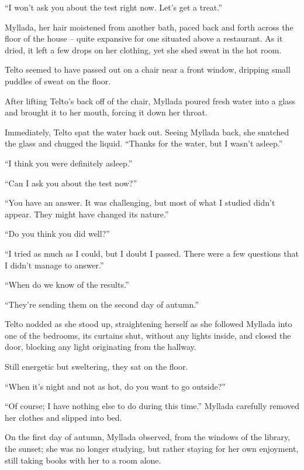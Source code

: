 ``I won't ask you about the test right now. Let's get a treat.''

\centeredstars

Myllada, her hair moistened from another bath, paced back and forth across the floor of the house -- quite expansive for one situated above a restaurant. As it dried, it left a few drops on her clothing, yet she shed sweat in the hot room.

Telto seemed to have passed out on a chair near a front window, dripping small puddles of sweat on the floor.

After lifting Telto's back off of the chair, Myllada poured fresh water into a glass and brought it to her mouth, forcing it down her throat.

Immediately, Telto spat the water back out. Seeing Myllada back, she snatched the glass and chugged the liquid. ``Thanks for the water, but I wasn't asleep.''

``I think you were definitely asleep.''

``Can I ask you about the test now?''

``You have an answer. It was challenging, but most of what I studied didn't appear. They might have changed its nature.''

``Do you think you did well?''

``I tried as much as I could, but I doubt I passed. There were a few questions that I didn't manage to answer.''

``When do we know of the results.''

``They're sending them on the second day of autumn.''

Telto nodded as she stood up, straightening herself as she followed Myllada into one of the bedrooms, its curtains shut, without any lights inside, and closed the door, blocking any light originating from the hallway.

Still energetic but sweltering, they sat on the floor.

``When it's night and not as hot, do you want to go outside?''

``Of course; I have nothing else to do during this time.'' Myllada carefully removed her clothes and slipped into bed.

\centeredstars

On the first day of autumn, Myllada observed, from the windows of the library, the sunset; she was no longer studying, but rather staying for her own enjoyment, still taking books with her to a room alone.

